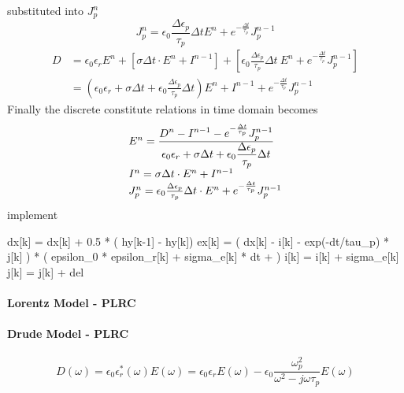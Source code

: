 substituted into $J_p^n$
\begin{equation}
  J_p^n = \epsilon_0\frac{\Delta\epsilon_p}{\tau_p}\Delta t E^n + e^{-\frac{\Delta t}{\tau_p}} J_p^{n-1}
\end{equation}
\begin{equation}
  \begin{split}
    D & = \epsilon_0 \epsilon_r E^n + \left[\sigma \Delta t\cdot E^n + I^{n-1}\right] + \left[\epsilon_0 \frac{\Delta \epsilon_p}{\tau_p}\Delta t\ E^n + e^{-\frac{\Delta t}{\tau_p}} J_p^{n-1}\right]\\
    & = \left(\epsilon_0 \epsilon_r + \sigma \Delta t + \epsilon_0 \frac{\Delta \epsilon_p}{\tau_p} \Delta t\right)E^n + I^{n-1} + e^{-\frac{\Delta t}{\tau_p}} J_p^{n-1}
  \end{split}
\end{equation}
Finally the discrete constitute relations in time domain becomes
\begin{gather}
  \begin{array}{@{}l@{}}
    E^n =  \frac{\displaystyle D^n - I^{n-1} - e^{-\frac{\Delta t}{\tau_p}}J_p^{n-1} }{\displaystyle\epsilon_0 \epsilon_r + \sigma \Delta t + \epsilon_0 \frac{\Delta \epsilon_p}{\tau_p} \Delta t}\\    
    I^n = \sigma\Delta t\cdot E^n + I^{n-1}\\
    J_p^n = \epsilon_0\frac{\Delta\epsilon_p}{\tau_p}\Delta t\cdot E^n + e^{-\frac{\Delta t}{\tau_p}} J_p^{n-1}
  \end{array}
\end{gather}
implement
\begin{code}
  dx[k] = dx[k] + 0.5 * ( hy[k-1] - hy[k])
  ex[k] = ( dx[k] - i[k] - exp(-dt/tau_p) * j[k] ) 
  * ( epsilon_0 * epsilon_r[k] + sigma_e[k] * dt +  )
  i[k] = i[k] + sigma_e[k] 
  j[k] = j[k] + del
\end{code}






\paragraph{{\msjh Lorentz Model - PLRC}}


\paragraph{{\msjh Drude Model - PLRC}}
\begin{equation}
  D(\omega) = \epsilon_0\epsilon_r^*(\omega)E(\omega) = \epsilon_0\epsilon_rE(\omega) - \epsilon_0\frac{\omega_p^2}{\omega^2-j\omega\tau_p}E(\omega)
\end{equation}

